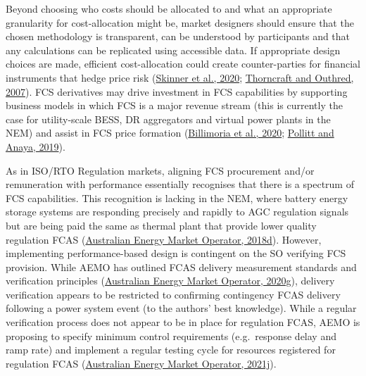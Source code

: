\documentclass[12pt,a4paper,]{report}
\begin{document}
Beyond choosing who costs should be allocated to and what an appropriate
granularity for cost-allocation might be, market designers should ensure
that the chosen methodology is transparent, can be understood by
participants and that any calculations can be replicated using
accessible data. If appropriate design choices are made, efficient
cost-allocation could create counter-parties for financial instruments
that hedge price risk
(\protect\hyperlink{ref-skinnerIncorporatingNewPower2020}{Skinner et
al., 2020};
\protect\hyperlink{ref-thorncraftExperienceMarketbasedAncillary2007}{Thorncraft
and Outhred, 2007}). FCS derivatives may drive investment in FCS
capabilities by supporting business models in which FCS is a major
revenue stream (this is currently the case for utility-scale BESS, DR
aggregators and virtual power plants in the NEM) and assist in FCS price
formation
(\protect\hyperlink{ref-billimoriaMarketDesignSystem2020}{Billimoria et
al., 2020};
\protect\hyperlink{ref-pollittCompetitionMarketsAncillary2019}{Pollitt
and Anaya, 2019}).

As in ISO/RTO Regulation markets, aligning FCS procurement and/or
remuneration with performance essentially recognises that there is a
spectrum of FCS capabilities. This recognition is lacking in the NEM,
where battery energy storage systems are responding precisely and
rapidly to AGC regulation signals but are being paid the same as thermal
plant that provide lower quality regulation FCAS
(\protect\hyperlink{ref-australianenergymarketoperatorInitialOperationHornsdale2018}{Australian
Energy Market Operator, 2018d}). However, implementing performance-based
design is contingent on the SO verifying FCS provision. While AEMO has
outlined FCAS delivery measurement standards and verification principles
(\protect\hyperlink{ref-australianenergymarketoperatorMarketAncillaryService2020a}{Australian
Energy Market Operator, 2020g}), delivery verification appears to be
restricted to confirming contingency FCAS delivery following a power
system event (to the authors' best knowledge). While a regular
verification process does not appear to be in place for regulation FCAS,
AEMO is proposing to specify minimum control requirements (e.g.~response
delay and ramp rate) and implement a regular testing cycle for resources
registered for regulation FCAS
(\protect\hyperlink{ref-australianenergymarketoperatorAmendmentMarketAncillary2021}{Australian
Energy Market Operator, 2021j}).
\end{document}
